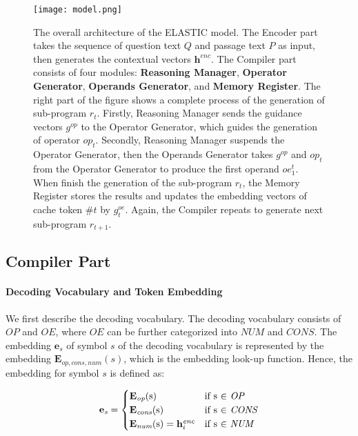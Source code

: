\documentclass{article}
\begin{document}
\begin{figure}[tbph!] 
\centering
\texttt{[image: model.png]} 
\caption{The overall architecture of the ELASTIC model. The Encoder part takes the sequence of question text \(Q\) and passage text \(P\) as input, then generates the contextual vectors \(\mathbf{h}^{\textit{enc}}\). The Compiler part consists of four modules: \textbf{Reasoning Manager}, \textbf{Operator Generator}, \textbf{Operands Generator}, and \textbf{Memory Register}. The right part of the figure shows a complete process of the generation of sub-program \(r_{t}\). Firstly, Reasoning Manager sends the guidance vectors \(g^{op}\) to the Operator Generator, which guides the generation of operator \(op_{t}\). Secondly, Reasoning Manager suspends the Operator Generator, then the Operands Generator takes \(g^{op}\) and \(op_{t}\) from the Operator Generator to produce the first operand \(oe^{t}_{1}\). When finish the generation of the sub-program \(r_{t}\), the Memory Register stores the results and updates the embedding vectors of cache token \(\#t\) by \(g^{oe}_{t}\). Again, the Compiler repeats to generate next sub-program \(r_{t+1}\).} 
\label{fig:Model-Architecture}
\end{figure}

\subsection{Compiler Part}

\paragraph{Decoding Vocabulary and Token Embedding}

We first describe the decoding vocabulary. The decoding vocabulary consists of \(\textit{OP}\) and \(\textit{OE}\), where \(\textit{OE}\) can be further categorized into \(\textit{NUM}\) and \(\textit{CONS}\). The embedding \(\mathbf{e}_{s}\) of symbol \(s\) of the decoding vocabulary is represented by the embedding \(\mathbf{E}_{\textit{op},\textit{cons},\textit{num}}(s)\), which is the embedding look-up function. Hence, the embedding for symbol \(s\) is defined as:

\begin{equation}
  \mathbf{e}_{\textit{s}} =
    \begin{cases}
      \mathbf{E}_{\textit{op}}(\text{s}) & \text{if s \(\in\) \textit{OP}}\\
      \mathbf{E}_{\textit{cons}}(\text{s}) & \text{if s \(\in\) \textit{CONS}}\\
      \mathbf{E}_{\textit{num}}(\text{s}) = \mathbf{h}^{\textit{enc}}_{i} & \text{if s \(\in\) \textit{NUM}}
    \end{cases}       
\end{equation}
\end{document}
